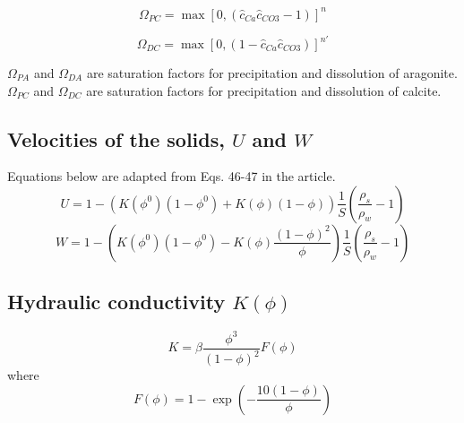 \documentclass[10pt, letterpaper]{article}
\begin{document}
\begin{equation}
\Omega_{PC} = \max\left[0, (\hat{c}_{Ca} \hat{c}_{CO3}  - 1 )\right] ^n \nonumber 
\end{equation}

\begin{equation}
\Omega_{DC} = \max\left[0, (1 - \hat{c}_{Ca} \hat{c}_{CO3})\right]^{n'} \nonumber
\end{equation}

$\Omega_{PA}$ and $\Omega_{DA}$ are saturation factors for precipitation and dissolution of aragonite. $\Omega_{PC}$ and $\Omega_{DC}$ are saturation factors for precipitation and dissolution of calcite.

\subsection{Velocities of the solids, $U$ and $W$}
Equations below are adapted from Eqs. 46-47 in the article.
\begin{equation}
    U = 1 - \left(K(\phi^0)(1-\phi^0) + K(\phi)(1-\phi)\right) \frac{1}{S}\left(\frac{\rho_s}{\rho_w}-1\right) \nonumber
\end{equation}
\begin{equation}
    W = 1 - \left(K(\phi^0)(1-\phi^0) - K(\phi) \frac{(1-\phi)^2}{\phi}\right)\frac{1}{S}\left(\frac{\rho_s}{\rho_w}-1\right) \nonumber
\end{equation}

\subsection{Hydraulic conductivity $K(\phi)$}

\begin{equation}
    K = \beta \frac{\phi^3}{(1 - \phi)^2}F(\phi) \tag{15}
\end{equation}
where
\begin{equation}
    F(\phi) = 1 - \exp\left( -\frac{10(1-\phi)}{\phi} \right) \tag{17}
\end{equation}
\end{document}
